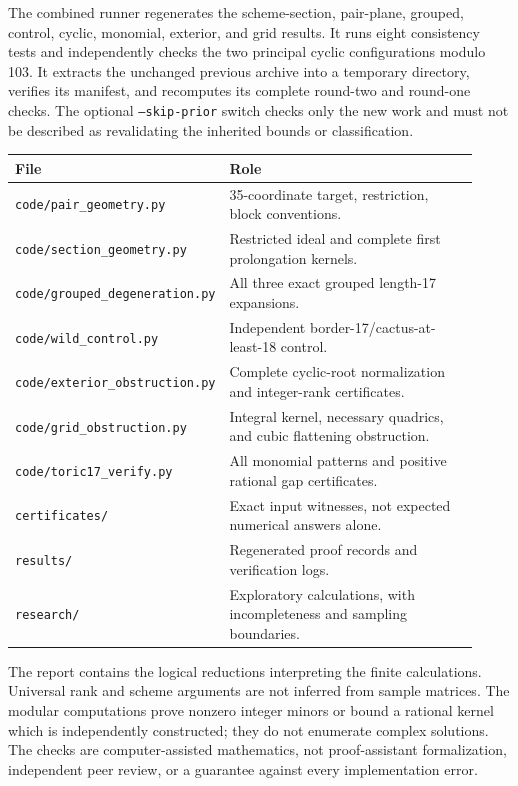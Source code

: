 \documentclass[11pt]{article}
\theoremstyle{definition}\newtheorem{definition}[theorem]{Definition}
\theoremstyle{remark}\newtheorem{remark}[theorem]{Remark}
\begin{document}
The combined runner regenerates the scheme-section, pair-plane, grouped,
control, cyclic, monomial, exterior, and grid results. It runs eight
consistency tests and independently checks the two principal cyclic
configurations modulo 103. It extracts the unchanged previous archive into
a temporary directory, verifies its manifest, and recomputes its complete
round-two and round-one checks. The optional \texttt{--skip-prior} switch
checks only the new work and must not be described as revalidating the
inherited bounds or classification.

\begin{center}
\begin{tabular}{p{0.37\linewidth}p{0.55\linewidth}}
\toprule
File&Role\\
\midrule
\texttt{code/pair\_geometry.py}&35-coordinate target, restriction, block conventions.\\
\texttt{code/section\_geometry.py}&Restricted ideal and complete first prolongation kernels.\\
\texttt{code/grouped\_degeneration.py}&All three exact grouped length-17 expansions.\\
\texttt{code/wild\_control.py}&Independent border-17/cactus-at-least-18 control.\\
\texttt{code/exterior\_obstruction.py}&Complete cyclic-root normalization and integer-rank certificates.\\
\texttt{code/grid\_obstruction.py}&Integral kernel, necessary quadrics, and cubic flattening obstruction.\\
\texttt{code/toric17\_verify.py}&All monomial patterns and positive rational gap certificates.\\
\texttt{certificates/}&Exact input witnesses, not expected numerical answers alone.\\
\texttt{results/}&Regenerated proof records and verification logs.\\
\texttt{research/}&Exploratory calculations, with incompleteness and sampling boundaries.\\
\bottomrule
\end{tabular}
\end{center}

The report contains the logical reductions interpreting the finite
calculations. Universal rank and scheme arguments are not inferred from
sample matrices. The modular computations prove nonzero integer minors or
bound a rational kernel which is independently constructed; they do not
enumerate complex solutions. The checks are computer-assisted mathematics,
not proof-assistant formalization, independent peer review, or a guarantee
against every implementation error.
\end{document}
